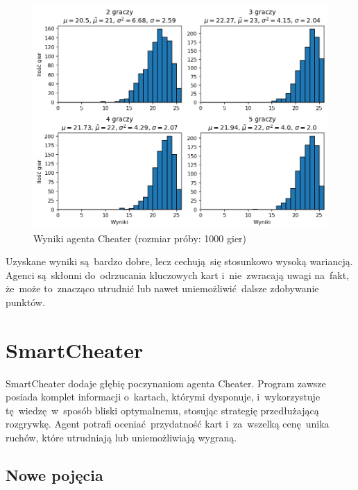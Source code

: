 \documentclass[declaration,shortabstract,inz]{iithesis}
\begin{document}
\begin{figure}[H]
	\centering
	\captionsetup{format=hang}
	\includegraphics[width=\textwidth,height=\textheight,keepaspectratio]{Cheater.png}
	\caption[Caption]{Wyniki agenta Cheater (rozmiar próby: 1000 gier)}
	\label{fig:Cheater}
\end{figure}

Uzyskane wyniki są~bardzo dobre, lecz cechują~się stosunkowo wysoką wariancją. Agenci są~skłonni do~odrzucania kluczowych kart i~nie~zwracają uwagi na~fakt, że~może to~znacząco utrudnić lub nawet uniemożliwić dalsze zdobywanie punktów.

\section{SmartCheater}

SmartCheater dodaje głębię poczynaniom agenta Cheater. Program zawsze posiada komplet informacji o~kartach, którymi dysponuje, i~wykorzystuje tę~wiedzę w~sposób bliski optymalnemu, stosując strategię przedłużającą rozgrywkę. Agent potrafi oceniać przydatność kart i~za~wszelką cenę unika ruchów, które utrudniają lub uniemożliwiają wygraną.

\subsection*{Nowe pojęcia}
\end{document}
